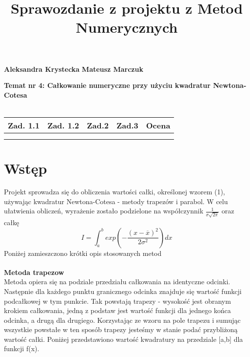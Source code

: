 \documentclass{article}
\title{Sprawozdanie z projektu z Metod Numerycznych}
\begin{document}
		\maketitle	
	
	\pagestyle{fancy}
	\textbf {Aleksandra Krystecka} \newline
	\textbf {Mateusz Marczuk} \newline

	\textbf{Temat nr 4: Całkowanie numeryczne przy użyciu kwadratur Newtona-Cotesa}\\\\

	\begin{center}
		
		\begin{tabular}{|c|c|c|c|c|}
			\hline
			Zad. 1.1 & Zad. 1.2 &  Zad.2 & Zad.3 & Ocena\\\hline
			 & & & & \\
			 & & & & \\\hline
		\end{tabular}

	\end{center}
	\section{Wstęp}
	Projekt sprowadza się do obliczenia wartości całki, określonej wzorem (1), używając kwadratur Newtona-Cotesa - metody trapezów i parabol. W celu ułatwienia obliczeń, wyrażenie zostało podzielone na współczynnik $\frac{1}{\sigma\sqrt{2\pi}}$ oraz całkę
		\begin{equation}
			I = \int_{a}^{b} exp  \left( - \frac{(x-\overline{x})^2}{2\sigma^2}   \right) dx
		\end{equation}
	Poniżej zamieszczono krótki opis stosowanych metod
	\\\\
	\textbf {Metoda trapezow }
	\\ 
	Metoda opiera się na podziale przedziału całkowania na identyczne odcinki. Następnie dla każdego punktu granicznego odcinka znajduje się wartość funkcji podcałkowej w tym punkcie. Tak powstają trapezy - wysokość jest obranym krokiem całkowania, jedną z podstaw jest wartość funkcji dla jednego końca odcinka, a drugą dla drugiego. Korzystając ze wzoru na pole trapezu i sumując wszystkie powstałe w ten sposób trapezy jesteśmy w stanie podać przybliżoną wartość całki. Poniżej przedstawiono wartość kwadratury na przedziale [a,b] dla funkcji f(x).
	
\end{document}
